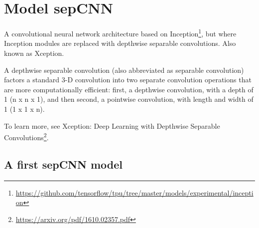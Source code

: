 \documentclass[
]{article}
\DeclareRobustCommand{\href}[2]{#2\footnote{\url{#1}}}
\begin{document}
\hypertarget{model-sepcnn}{%
\section{Model sepCNN}\label{model-sepcnn}}

A convolutional neural network architecture based on
\href{https://github.com/tensorflow/tpu/tree/master/models/experimental/inception}{Inception},
but where Inception modules are replaced with depthwise separable
convolutions. Also known as Xception.

A depthwise separable convolution (also abbreviated as separable
convolution) factors a standard 3-D convolution into two separate
convolution operations that are more computationally efficient: first, a
depthwise convolution, with a depth of 1 (n x n x 1), and then second, a
pointwise convolution, with length and width of 1 (1 x 1 x n).

To learn more, see \href{https://arxiv.org/pdf/1610.02357.pdf}{Xception:
Deep Learning with Depthwise Separable Convolutions}.

\hypertarget{a-first-sepcnn-model}{%
\subsection{A first sepCNN model}\label{a-first-sepcnn-model}}
\end{document}
